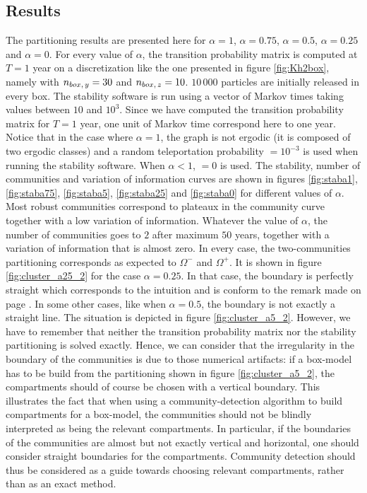 \subsection{Results}
The partitioning results are presented here for $\alpha = 1$, $\alpha = 0.75$, $\alpha = 0.5$, $\alpha = 0.25$ and $\alpha = 0$. For every value of $\alpha$, the transition probability matrix is computed at $T = 1$ year on a discretization like the one presented in figure \ref{fig:Kh2box}, namely with $n_{box,\,y} = 30$ and $n_{box,\,z} = 10$. $10\,000$ particles are initially released in every box. The stability software is run using a vector of Markov times taking values between $10$ and $10^3$. Since we have computed the transition probability matrix for $T = 1$ year, one unit of Markov time correspond here to one year. Notice that in the case where $\alpha = 1$, the graph is not ergodic (it is composed of two ergodic classes) and a random teleportation probability  $= 10^{-3}$ is used when running the stability software. When $\alpha < 1$,  $=0$ is used.
The stability, number of communities and variation of information curves are shown in figures \ref{fig:staba1}, \ref{fig:staba75}, \ref{fig:staba5}, \ref{fig:staba25} and \ref{fig:staba0} for different values of $\alpha$. Most robust communities correspond to plateaux in the community curve together with a low variation of information. Whatever the value of $\alpha$, the number of communities goes to $2$ after maximum $50$ years, together with a variation of information that is almost zero. In every case, the two-communities partitioning corresponds as expected to $\Omega^-$ and $\Omega^+$. It is shown in figure \ref{fig:cluster_a25_2} for the case $\alpha = 0.25$. In that case, the boundary is perfectly straight which corresponds to the intuition and is conform to the remark made on page \pageref{remark:straightboundaries}. In some other cases, like when $\alpha = 0.5$, the boundary is not exactly a straight line. The situation is depicted in figure \ref{fig:cluster_a5_2}. However, we have to remember that neither the transition probability matrix nor the stability partitioning is solved exactly. Hence, we can consider that the irregularity in the boundary of the communities is due to those numerical artifacts: if a box-model has to be build from the partitioning shown in figure \ref{fig:cluster_a5_2}, the compartments should of course be chosen with a vertical boundary. This illustrates the fact that when using a community-detection algorithm to build compartments for a box-model, the communities should not be blindly interpreted as being the relevant compartments. In particular, if the boundaries of the communities are almost but not exactly vertical and horizontal, one should consider straight boundaries for the compartments. Community detection should thus be considered as a guide towards choosing relevant compartments, rather than as an exact method.

